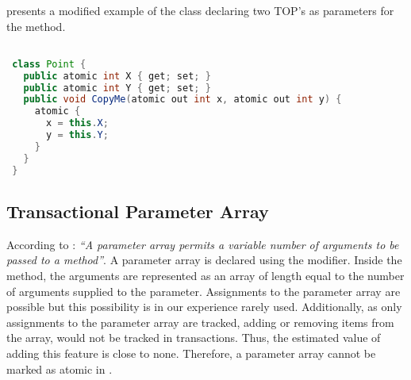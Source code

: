  presents a modified example of the  class declaring two \ac{TOP}'s as parameters for the  method.

\begin{lstlisting}[label=lst:atomic_out,
 caption={Transactional Output Parameter},
 language=Java, 
 showspaces=false,
 showtabs=false,
 breaklines=true,
 showstringspaces=false,
 breakatwhitespace=true,
 commentstyle=\color{greencomments},
 keywordstyle=\color{bluekeywords},
 stringstyle=\color{redstrings},
 morekeywords={atomic, retry, orElse, var, get, set, ref, out}]  % Start your code-block

 class Point {
   public atomic int X { get; set; }
   public atomic int Y { get; set; }
   public void CopyMe(atomic out int x, atomic out int y) {
     atomic {
       x = this.X;
       y = this.Y;
     }
   }   
 }
\end{lstlisting}

\subsection{Transactional Parameter Array}\label{sec:stm_design_paramter_array}
According to \cite[p. 17]{csharp2013specificaiton}: \textit{``A parameter array permits a variable number of arguments to be passed to a method''}. A parameter array is declared using the  modifier. Inside the method, the arguments are represented as an array of length equal to the number of arguments supplied to the  parameter. Assignments to the parameter array are possible but this possibility is in our experience rarely used. Additionally, as only assignments to the parameter array are tracked, adding or removing items from the array, would not be tracked in transactions. Thus, the estimated value of adding this feature is close to none. Therefore, a parameter array cannot be marked as atomic in \stmname.

